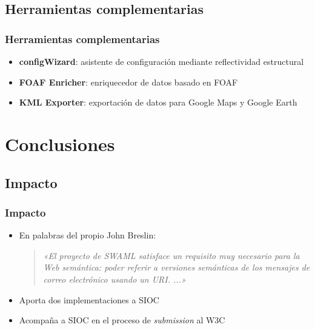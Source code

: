 \documentclass[spanish,notes=hide]{beamer}
\begin{document}
\subsection{Herramientas complementarias}
\frame
{
  \frametitle{Herramientas complementarias}

  \begin{itemize}
   \item<1-> \textbf{configWizard}: asistente de configuración mediante reflectividad estructural
   \item<2-> \textbf{FOAF Enricher}: enriquecedor de datos basado en FOAF
   \item<3-> \textbf{KML Exporter}: exportación de datos para Google Maps y Google Earth
  \end{itemize}

  \begin{center}
  \end{center}
}

\section{Conclusiones}
\subsection{Impacto}
\frame
{
  \frametitle{Impacto}

  \begin{itemize}
   \item<1-> En palabras del propio John Breslin:
	\begin{quote}
 	  \emph{«El proyecto de SWAML satisface un requisito muy necesario para la Web semántica: 
	  poder referir a versiones semánticas de los mensajes de correo electrónico usando
	  un URI. ...»}
	\end{quote}
   \item<2-> Aporta dos implementaciones a SIOC
   \item<3-> Acompaña a SIOC en el proceso de \textit{submission} al W3C
  \end{itemize}

}
\end{document}
